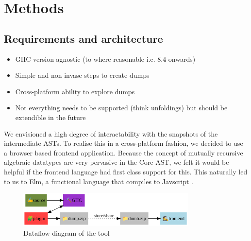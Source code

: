 \chapter{Methods}

\section{Requirements and architecture}

\begin{itemize}
  \item GHC version agnostic (to where reasonable i.e. 8.4 onwards)
  \item Simple and non invase steps to create dumps
  \item Cross-platform ability to explore dumps
  \item Not everything needs to be supported (think unfoldings) but should be extendible in the future
\end{itemize}

We envisioned a high degree of interactability with the snapshots of the intermediate ASTs. To realise this
in a cross-platform fashion, we decided to use a browser based frontend application. Because the concept of
mutually recursive algebraic datatypes are very pervasive in the Core AST, we felt it would be helpful
if the frontend language had first class support for this. This naturally led to us to Elm, a functional language
that compiles to Javscript \cite{elm_lang}.

\begin{figure}[h]
  \centering
  \includegraphics[width=0.8\textwidth]{figs/architecture.png}
  \caption{Dataflow diagram of the tool}
  \label{fig:architecture}
\end{figure}


%     
% 
%     
%   
%   
% 
% 
